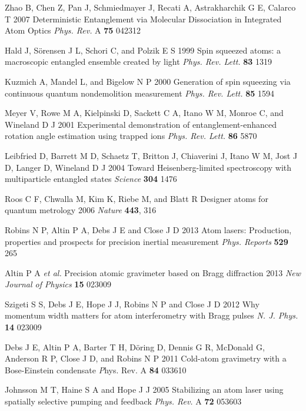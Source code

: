 \documentclass{iopart}
\begin{document}
\begin{thebibliography}{10}
 Zhao B, Chen Z, Pan J, Schmiedmayer J, Recati A, Astrakharchik G E, Calarco T 2007 Deterministic Entanglement via Molecular Dissociation in Integrated Atom Optics \emph{Phys. Rev.} A {\bf 75} 042312

 Hald J, S{\"{o}}rensen J L, Schori C, and Polzik E S 1999 Spin squeezed atoms: a macroscopic entangled ensemble created by light \emph{Phys. Rev. Lett.} {\bf 83} 1319

 Kuzmich A, Mandel L, and Bigelow N P 2000 Generation of spin squeezing via continuous quantum nondemolition measurement \emph{Phys. Rev. Lett.} {\bf 85} 1594 

 Meyer V, Rowe M A, Kielpinski D, Sackett C A, Itano W M, Monroe C, and Wineland D J 2001 Experimental demonstration of entanglement-enhanced rotation angle estimation using trapped ions \emph{Phys. Rev. Lett.} {\bf 86} 5870

 Leibfried D, Barrett M D, Schaetz T, Britton J, Chiaverini J, Itano W M, Jost J D, Langer D, Wineland D J 2004 Toward Heisenberg-limited spectroscopy with multiparticle entangled states \emph{Science} {\bf 304} 1476

 Roos C F, Chwalla M, Kim K, Riebe M, and Blatt R Designer atoms for
quantum metrology 2006 \emph{Nature} {\bf 443}, 316

 Robins N P, Altin P A, Debs J E and Close J D 2013 Atom lasers: Production, properties and prospects for precision inertial measurement \emph{Phys. Reports} {\bf 529} 265

 Altin P A \emph{et al.} Precision atomic gravimeter based on Bragg diffraction 2013 \emph{New Journal of Physics} {\bf 15} 023009

 Szigeti S S, Debs J E, Hope J J, Robins N P and Close J D 2012 Why momentum width matters for atom interferometry with Bragg pulses \emph{N. J. Phys.} {\bf 14} 023009

 Debs J E, Altin P A, Barter T H, D{\"{o}}ring D, Dennis G R, McDonald G, Anderson R P, Close J D, and
Robins N P 2011 Cold-atom gravimetry with a Bose-Einstein condensate {\emph Phys. Rev.} A {\bf 84} 033610

 Johnsson M T, Haine S A and Hope J J 2005 Stabilizing an atom laser using spatially selective pumping and feedback \emph{Phys. Rev.} A {\bf 72} 053603


\end{thebibliography}
\end{document}

